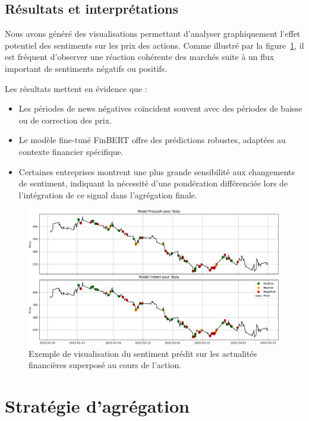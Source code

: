 \documentclass[a4paper,12pt]{article}
\begin{document}
\subsection*{Résultats et interprétations}

Nous avons généré des visualisations permettant d'analyser graphiquement l'effet potentiel des sentiments sur les prix des actions. Comme illustré par la figure~\ref{fig:sentiments}, il est fréquent d'observer une réaction cohérente des marchés suite à un flux important de sentiments négatifs ou positifs.

Les résultats mettent en évidence que :
\begin{itemize}
    \item Les périodes de news négatives coïncident souvent avec des périodes de baisse ou de correction des prix.
    \item Le modèle fine-tuné FinBERT offre des prédictions robustes, adaptées au contexte financier spécifique.
    \item Certaines entreprises montrent une plus grande sensibilité aux changements de sentiment, indiquant la nécessité d'une pondération différenciée lors de l'intégration de ce signal dans l'agrégation finale.
\end{itemize}

\begin{figure}[h!]
    \centering
    \includegraphics[width=\textwidth]{Model Comparison.png}
    \caption{Exemple de visualisation du sentiment prédit sur les actualités financières superposé au cours de l'action.}
    \label{fig:sentiments}
\end{figure}


\section{Stratégie d’agrégation}
\end{document}

